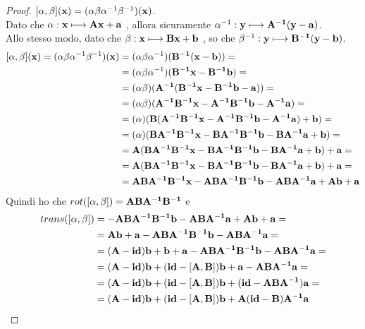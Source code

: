 \documentclass[10pt,a4paper]{book}
\begin{document}
\begin{proof}
	$ [ \alpha, \beta ](\vb{x}) = ( \alpha \beta \alpha^{-1} \beta^{-1} ) (\vb{x})$. \\
	Dato che $ \alpha : \vb{x} \longmapsto \vb{Ax + a}$ , allora sicuramente  $\alpha^{-1}: \vb{y} \longmapsto \vb{A^{-1}(y-a)}$.  \\
	Allo stesso modo, dato che $ \beta : \vb{x} \longmapsto \vb{Bx + b}$ , so che $\beta^{-1}: \vb{y} \longmapsto \vb{B^{-1}(y-b)}$. 
\begin{equation*}
\begin{split}
[ \alpha, \beta ](\vb{x}) = (\alpha \beta \alpha^{-1} \beta^{-1} ) (\vb{x})
& = (\alpha \beta \alpha^{-1})( \vb{B^{-1}(x-b)}) = \\ 
& = (\alpha \beta \alpha^{-1})( \vb{B^{-1}x- B^{-1}b }) = \\ 
& = (\alpha \beta)(\vb{A^{-1}( B^{-1}x- B^{-1}b -a)})= \\
& =  (\alpha \beta)(\vb{A^{-1} B^{-1}x- A^{-1}B^{-1}b -A^{-1}a})  = \\
& = (\alpha)(\vb{B(A^{-1} B^{-1}x- A^{-1}B^{-1}b -A^{-1}a) +b}) = \\
& = (\alpha)(\vb{BA^{-1} B^{-1}x-BA^{-1}B^{-1}b -BA^{-1}a +b}) = \\
& = \vb{A(BA^{-1} B^{-1}x-BA^{-1}B^{-1}b -BA^{-1}a +b) + a} = \\
& = \vb{A(BA^{-1} B^{-1}x-BA^{-1}B^{-1}b -BA^{-1}a +b) + a} = \\
& = \vb{ABA^{-1} B^{-1}x-ABA^{-1}B^{-1}b -ABA^{-1}a +Ab + a }
\end{split}
\end{equation*}
Quindi ho che $ rot([ \alpha , \beta ]) = \vb{ABA^{-1} B^{-1} }$ e
\begin{equation*}
\begin{split}
trans([ \alpha, \beta ]) & = \vb{-ABA^{-1}B^{-1}b -ABA^{-1}a +Ab + a }= \\
& = \vb{Ab + a -ABA^{-1}B^{-1}b -ABA^{-1}a }= \\
& = \vb{(A-id)b + b + a -ABA^{-1}B^{-1}b -ABA^{-1}a} = \\
& = \vb{(A-id)b + (id-[A,B])b + a - ABA^{-1}a} = \\
& = \vb{(A-id)b + (id-[A,B])b + (id- ABA^{-1})a }= \\
& = \vb{(A-id)b + (id-[A,B])b + A(id- B)A^{-1}a} 
\end{split}
\end{equation*}	
\end{proof}
\end{document}
